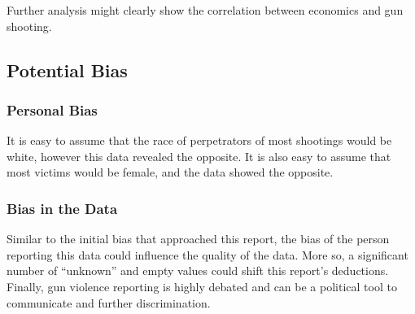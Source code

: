 \documentclass[
]{article}
\begin{document}
Further analysis might clearly show the correlation between economics
and gun shooting.

\hypertarget{potential-bias}{%
\subsection{Potential Bias}\label{potential-bias}}

\hypertarget{personal-bias}{%
\subsubsection{Personal Bias}\label{personal-bias}}

It is easy to assume that the race of perpetrators of most shootings
would be white, however this data revealed the opposite. It is also easy
to assume that most victims would be female, and the data showed the
opposite.

\hypertarget{bias-in-the-data}{%
\subsubsection{Bias in the Data}\label{bias-in-the-data}}

Similar to the initial bias that approached this report, the bias of the
person reporting this data could influence the quality of the data. More
so, a significant number of ``unknown'' and empty values could shift
this report's deductions. Finally, gun violence reporting is highly
debated and can be a political tool to communicate and further
discrimination.
\end{document}
